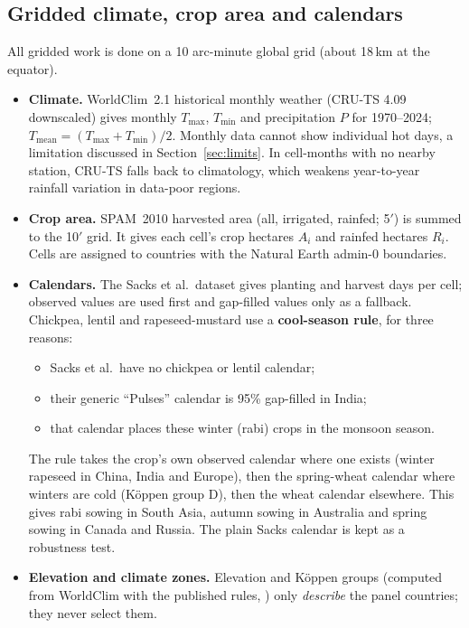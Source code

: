 \subsection{Gridded climate, crop area and calendars}
All gridded work is done on a 10 arc-minute global grid (about 18\,km at the equator).
\begin{itemize}
\item \textbf{Climate.} WorldClim~2.1 historical monthly weather (CRU-TS 4.09 downscaled) gives monthly
$T_{\max}$, $T_{\min}$ and precipitation $P$ for 1970--2024; $T_{\text{mean}} = (T_{\max}+T_{\min})/2$. Monthly data
cannot show individual hot days, a limitation discussed in Section~\ref{sec:limits}. In cell-months with no nearby
station, CRU-TS falls back to climatology, which weakens year-to-year rainfall variation in data-poor regions.
\item \textbf{Crop area.} SPAM~2010 harvested area (all, irrigated, rainfed; 5$'$) is summed to the 10$'$ grid. It
gives each cell's crop hectares $A_i$ and rainfed hectares $R_i$. Cells are assigned to countries with the
Natural Earth admin-0 boundaries.
\item \textbf{Calendars.} The Sacks et al.\ dataset gives planting and harvest days per cell; observed values are
used first and gap-filled values only as a fallback. Chickpea, lentil and rapeseed-mustard use a
\textbf{cool-season rule}, for three reasons:
  \begin{itemize}
  \item Sacks et al.\ have no chickpea or lentil calendar;
  \item their generic ``Pulses'' calendar is 95\% gap-filled in India;
  \item that calendar places these winter (rabi) crops in the monsoon season.
  \end{itemize}
  The rule takes the crop's own observed calendar where one exists (winter rapeseed in China, India and Europe),
  then the spring-wheat calendar where winters are cold (K\"oppen group D), then the wheat calendar elsewhere. This
  gives rabi sowing in South Asia, autumn sowing in Australia and spring sowing in Canada and Russia. The plain
  Sacks calendar is kept as a robustness test.
\item \textbf{Elevation and climate zones.} Elevation and K\"oppen groups (computed from WorldClim with the
published rules, \citealp{beck2018}) only \emph{describe} the panel countries; they never select them.
\end{itemize}

